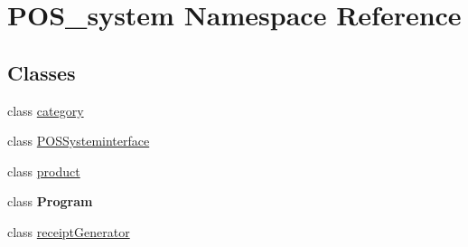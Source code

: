 \hypertarget{namespace_p_o_s__system}{}\section{P\+O\+S\+\_\+system Namespace Reference}
\label{namespace_p_o_s__system}
\subsection*{Classes}
\begin{DoxyCompactItemize}
\item 
class \mbox{\hyperlink{class_p_o_s__system_1_1category}{category}}
\item 
class \mbox{\hyperlink{class_p_o_s__system_1_1_p_o_s_systeminterface}{P\+O\+S\+Systeminterface}}
\item 
class \mbox{\hyperlink{class_p_o_s__system_1_1product}{product}}
\item 
class {\bfseries Program}
\item 
class \mbox{\hyperlink{class_p_o_s__system_1_1receipt_generator}{receipt\+Generator}}
\end{DoxyCompactItemize}
